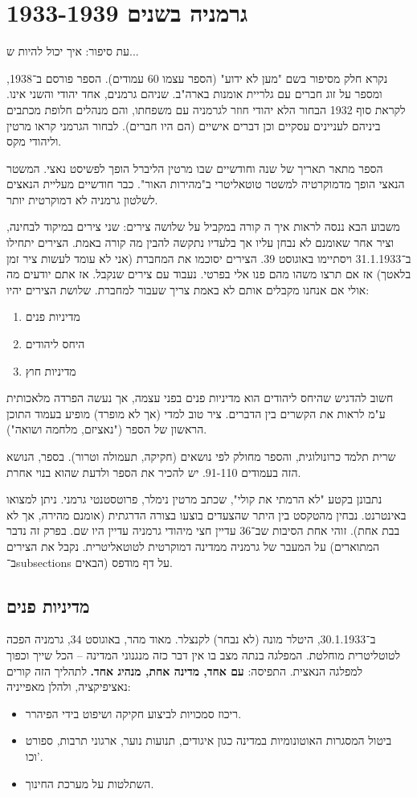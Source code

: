 \documentclass[a4paper]{book}
\begin{document}
	
	\section{גרמניה בשנים 1933-1939}
	
	עת סיפור: איך יכול להיות ש...
	
	נקרא חלק מסיפור בשם "מען לא ידוע" (הספר עצמו 60 עמודים). הספר פורסם ב־1938, ומספר על זוג חברים עם גלריית אומנות בארה"ב. שניהם גרמנים, אחד יהודי והשני אינו. לקראת סוף 1932 הבחור הלא יהודי חוזר לגרמניה עם משפחתו, והם מנהלים חלופת מכתבים ביניהם לעניינים עסקיים וכן דברים אישיים (הם היו חברים). לבחור הגרמני קראו מרטין וליהודי מקס. 
	
	הספר מתאר תאריך של שנה וחודשיים שבו מרטין הליברל הופך לפשיסט נאצי. המשטר הנאצי הופך מדמוקרטיה למשטר טוטאליטרי ב"מהירות האור". כבר חודשיים מעליית הנאצים לשלטון גרמניה לא דמוקרטית יותר. 
	
	משבוע הבא ננסה לראות איך ה קורה במקביל על שלושה צירים: שני צירים במיקוד לבחינה, וציר אחר שאומנם לא נבחן עליו אך בלעדיו נתקשה להבין מה קורה באמת. הצירים יתחילו ב־31.1.1933 ויסתיימו באוגוסט 39. הצירים יסוכמו את המחברת (אני לא עומד לעשות ציר זמן בלאטך) אז אם תרצו משהו מהם פנו אלי בפרטי. נעבוד עם צירים שנקבל. אז אתם יודעים מה אולי אם אנחנו מקבלים אותם לא באמת צריך שעבור למחברת. שלושת הצירים יהיו: 
	\begin{enumerate}
		\item מדיניות פנים
		\item היחס ליהודים
		\item מדיניות חוץ
	\end{enumerate}
	חשוב להדגיש שהיחס ליהודים הוא מדיניות פנים בפני עצמה, אך נעשה הפרדה מלאכותית ע"מ לראות את הקשרים בין הדברים. ציר טוב למדי (אך לא מופרד) מופיע בעמוד התוכן הראשון של הספר ("נאציזם, מלחמה ושואה"). 
	
	שרית תלמד כרונולוגית, והספר מחולק לפי נושאים (חקיקה, תעמולה וטרור). בספר, הנושא הזה בעמודים 91-110. יש להכיר את הספר ולדעת שהוא בנוי אחרת. 
	
	נתבונן בקטע "לא הרמתי את קולי", שכתב מרטין נימלר, פרוטסטנטי גרמני. ניתן למצואו באינטרנט. נבחין מהטקסט בין היתר שהצעדים בוצעו בצורה הדרגתית (אומנם מהירה, אך לא בבת אחת). זוהי אחת הסיבות שב־36 עדיין חצי מיהודי גרמניה עדיין היו שם. בפרק זה נדבר על המעבר של גרמניה ממדינה דמוקרטית לטוטאליטרית. 
	נקבל את הצירים (המתוארים ב־subsections הבאים) על דף מודפס. 
	
	\subsection{מדיניות פנים}
	ב־30.1.1933, היטלר מונה (לא נבחר) לקנצלר. מאוד מהר, באוגוסט 34, גרמניה הפכה לטוטליטרית מוחלטת. המפלגה בנתה מצב בו אין דבר כזה מנגנוני המדינה – הכל שייך וכפוך למפלגה הנאצית. התפיסה: \textbf{עם אחד, מדינה אחת, מנהיג אחד. }לתהליך הזה קורים נאציפיקציה, ולהלן מאפייניה: 
	\begin{itemize}
		\item ריכוז סמכויות לביצוע חקיקה ושיפוט בידי הפיהרר. 
		\item ביטול המסגרות האוטונומיות במדינה כגון איגודים, תנועות נוער, ארגוני תרבות, ספורט וכו'. 
		\item השתלטות על מערכת החינוך. 
	\end{itemize}
	
\end{document}
